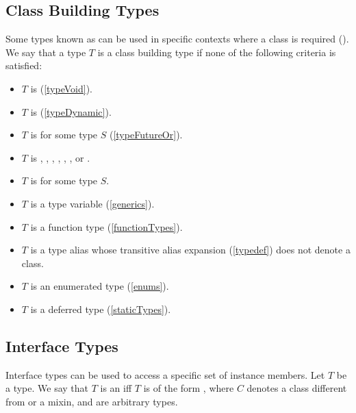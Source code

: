 \documentclass[makeidx]{article}
\begin{document}
{\subsection{Class Building Types}

\LMHash{}%
Some types known as
can be used in specific contexts where a class is required
().
We say that a type $T$ is a class building type
if none of the following criteria is satisfied:

\begin{itemize}
\item $T$ is \VOID{} (\ref{typeVoid}).
\item $T$ is \DYNAMIC{} (\ref{typeDynamic}).
\item $T$ is  for some type $S$ (\ref{typeFutureOr}).
\item
  $T$ is , , , , ,
  , or .
\item $T$ is  for some type $S$.
\item $T$ is a type variable (\ref{generics}).
\item $T$ is a function type (\ref{functionTypes}).
\item $T$ is a type alias whose transitive alias expansion
  (\ref{typedef}) does not denote a class.
\item $T$ is an enumerated type (\ref{enums}).
\item $T$ is a deferred type (\ref{staticTypes}).
\end{itemize}


\subsection{Interface Types}

\LMHash{}%
Interface types can be used to access
a specific set of instance members.
Let $T$ be a type.
We say that $T$ is an  if{}f
$T$ is of the form ,
where $C$ denotes a class different from  or a mixin,
and  are arbitrary types.

}
\end{document}
